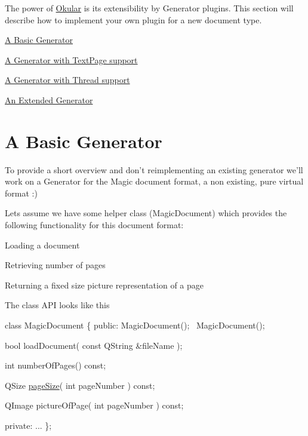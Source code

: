 The power of \hyperlink{namespaceOkular}{Okular} is its extensibility by Generator plugins. This section will describe how to implement your own plugin for a new document type.

\begin{DoxyItemize}
\item \hyperlink{okular_generators_okular_generators_basic}{A Basic Generator} \item \hyperlink{okular_generators_okular_generators_with_text}{A Generator with Text\+Page support} \item \hyperlink{okular_generators_okular_generators_threaded}{A Generator with Thread support} \item \hyperlink{okular_generators_okular_generators_extended}{An Extended Generator}\end{DoxyItemize}
\hypertarget{okular_generators_okular_generators_basic}{}\section{A Basic Generator}\label{okular_generators_okular_generators_basic}
To provide a short overview and don't reimplementing an existing generator we'll work on a Generator for the Magic document format, a non existing, pure virtual format \+:)

Lets assume we have some helper class (Magic\+Document) which provides the following functionality for this document format\+:

\begin{DoxyItemize}
\item Loading a document \item Retrieving number of pages \item Returning a fixed size picture representation of a page\end{DoxyItemize}
The class A\+P\+I looks like this


\begin{DoxyCode}
\textcolor{keyword}{class }MagicDocument
\{
    \textcolor{keyword}{public}:
        MagicDocument();
        ~MagicDocument();

        \textcolor{keywordtype}{bool} loadDocument( \textcolor{keyword}{const} QString &fileName );

        \textcolor{keywordtype}{int} numberOfPages() \textcolor{keyword}{const};

        QSize \hyperlink{classpageSize}{pageSize}( \textcolor{keywordtype}{int} pageNumber ) \textcolor{keyword}{const};

        QImage pictureOfPage( \textcolor{keywordtype}{int} pageNumber ) \textcolor{keyword}{const};

    \textcolor{keyword}{private}:
        ...
\};
\end{DoxyCode}


